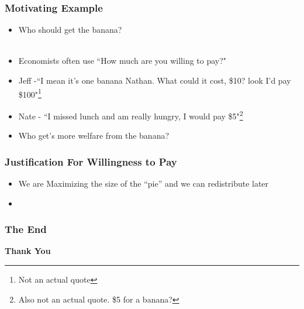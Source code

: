 \documentclass{beamer}
\begin{document}
\begin{frame}
\frametitle{Motivating Example}

	\begin{itemize}
			\setlength{\itemsep}{5mm}
		\large
	\item Who should get the banana? \\\\

	\item Economists often use ``How much are you willing to pay?" 
	
		\item Jeff -``I mean it’s one banana Nathan. What could it cost, \$10? look I'd pay \$100"\footnote[frame]{Not an actual quote} 
		
		\item Nate - ``I missed lunch and am really hungry, I would pay \$5"\footnote[frame]{Also not an actual quote. \$5 for a banana?} 
		
		\item Who get's more welfare from the banana?
			
	\end{itemize}


\end{frame}

\begin{frame}
\frametitle{Justification For Willingness to Pay}

\begin{itemize}
	\setlength{\itemsep}{5mm}
	\large 
	\item We are Maximizing the size of the “pie” and we can redistribute later 
		
	\item  
\end{itemize}


\end{frame}


\begin{frame}

\frametitle{The End }

\begin{center}
	
\begin{Huge}
\textbf{Thank You}
\end{Huge}
\end{center}
\end{frame}

\end{document}
